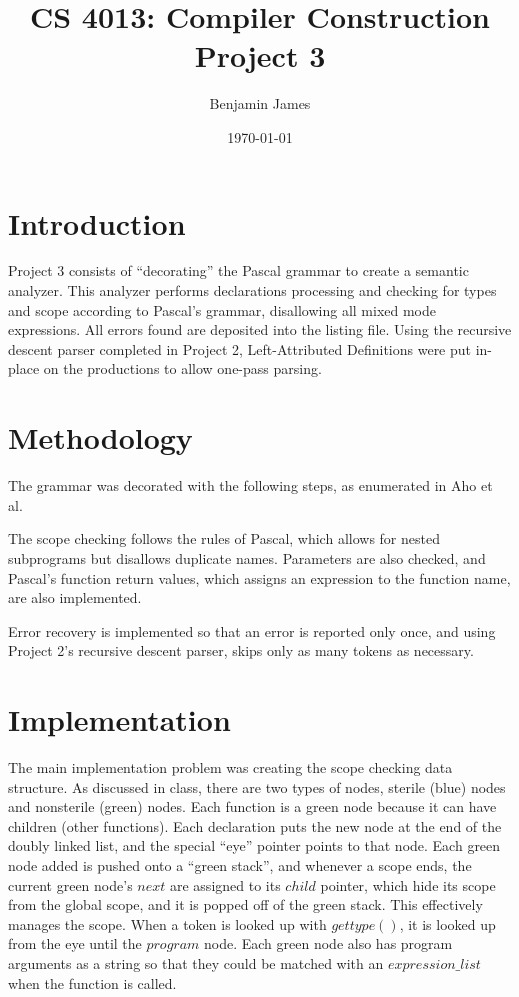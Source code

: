 \documentclass[titlepage]{article}
\author{Benjamin James}
\title{\textbf{CS 4013:  Compiler Construction \\ Project 3}}
\date{\today}
\begin{document}
\maketitle

\section*{Introduction}
Project 3 consists of ``decorating'' the Pascal grammar to create
a semantic analyzer. This analyzer performs declarations processing
and checking for types and scope according to Pascal's grammar, disallowing all mixed mode expressions. All errors found are deposited into the listing file. Using the recursive descent parser completed in Project 2, Left-Attributed Definitions were put in-place on the productions to allow one-pass parsing.

\section*{Methodology}
The grammar was decorated with the following steps, as enumerated in Aho et al.\cite{Aho86}

The scope checking follows the rules of Pascal, which allows for nested subprograms but disallows duplicate names.
Parameters are also checked, and Pascal's function return values, which assigns an expression to the function name,
are also implemented.

Error recovery is implemented so that an error is reported only once, and using Project 2's recursive descent parser, skips
only as many tokens as necessary.



\section*{Implementation}

The main implementation problem was creating the scope checking data structure. As discussed in class, there
are two types of nodes, sterile (blue) nodes and nonsterile (green) nodes. Each function is a green node because it can have children
(other functions). Each declaration puts the new node at the end of the doubly linked list, and the special ``eye'' pointer points to that node. Each green node added is pushed onto a ``green stack'', and whenever a scope ends, the current green node's $next$ are assigned to its $child$ pointer, which hide its scope from the global scope, and it is popped off of the green stack. This effectively manages the scope.
When a token is looked up with $gettype()$, it is looked up from the eye until the $program$ node. Each green node also has program arguments as a string so that they could be matched with an $expression\_list$ when the function is called.
\end{document}
